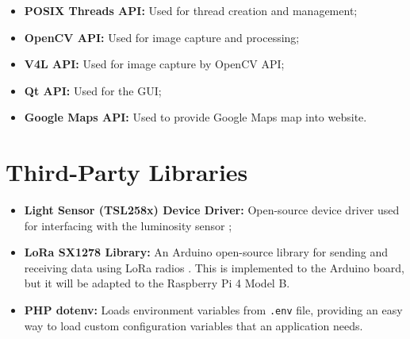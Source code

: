 \begin{itemize}
	\item \textbf{POSIX Threads API:} Used for thread creation and management;
	\item \textbf{OpenCV API:} Used for image capture and processing;
	\item \textbf{V4L API:} Used for image capture by OpenCV API;
	\item \textbf{Qt API:} Used for the GUI;
	\item \textbf{Google Maps API:} Used to provide Google Maps map into website.
\end{itemize}

\section{Third-Party Libraries}

\begin{itemize}
	\item \textbf{Light Sensor (TSL258x) Device Driver:} Open-source device driver used for interfacing with the luminosity sensor \cite{code_tsl};
	\item \textbf{LoRa SX1278 Library:} An Arduino open-source library for sending and receiving data using LoRa radios \cite{sx1278_lib}. This is implemented to the Arduino board, but it will be adapted to the Raspberry Pi 4 Model B.
	\item \textbf{PHP dotenv:} Loads environment variables from \verb|.env| file, providing an easy way to load custom configuration variables that an application needs. \cite{phpdotenv}
\end{itemize}
